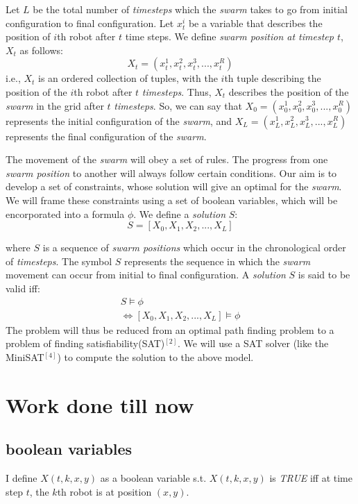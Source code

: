\documentclass{article}[11pt]
\begin{document}
		Let $L$ be the total number of \textit{timesteps} which the \textit{swarm} takes to go from initial configuration to final configuration.  
		Let $x_t^i$ be a variable that describes the position of $i$th robot after $t$ time steps.
		We define \textit{swarm position at timestep $t$},  $X_t$  as follows:
		$$
			X_t = (x_t^1, x_t^2, x_t^3, . . . , x_t^R)
		$$
		i.e., $X_t$ is an ordered collection of tuples, with the $i$th tuple describing the position of the $i$th robot after $t$ \textit{timesteps}. Thus, $X_t$ describes the position of the \textit{swarm} in the grid after $t$ \textit{timesteps}.		
		So, we can say that $X_0 =(x_0^1, x_0^2, x_0^3, . . . , x_0^R)$ represents the initial configuration of the \textit{swarm}, and $X_L = (x_L^1, x_L^2, x_L^3, . . . , x_L^R)$ represents the final configuration of the \textit{swarm}.

		The movement of the \textit{swarm} will obey a set of rules. The progress from one \textit{swarm position} to another will always follow certain conditions. Our aim is to develop a set of constraints, whose solution will give an optimal for the \textit{swarm}.
		We will frame these constraints using a set of boolean variables, which will be encorporated into a formula $\phi$.
		We define a \textit{solution} $S$:
		$$
			S = [X_0, X_1, X_2, . . . , X_L]  
		$$

		where $S$ is a sequence of \textit{swarm positions} which occur in the chronological order of \textit{timesteps}. The symbol $S$ represents the sequence in which the \textit{swarm} movement can occur from initial to final configuration. A \textit{solution} $S$ is said to be valid iff:
		\begin{gather}
				S \models \phi \\
			\Leftrightarrow  [X_0, X_1, X_2, . . . , X_L] \models \phi
		\end{gather}
		The problem will thus be reduced from an optimal path finding problem to a problem of finding satisfiability(SAT)$^{[2]}$. 
		We will use a SAT solver (like the MiniSAT$^{[4]}$) to compute the solution to the above model.

	\section{Work done till now}
		\subsection{boolean variables}
			I define $X(t, k, x, y)$ as a boolean variable s.t. $X(t, k, x, y)$ is \textit{TRUE} iff at time step $t$, the $k$th robot is at position $(x,y)$.
\end{document}
